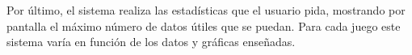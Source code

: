 Por último, el sistema realiza las estadísticas que el usuario pida, mostrando por pantalla el máximo número de datos útiles que se puedan. Para cada juego este sistema varía en función de los datos y gráficas enseñadas. 
